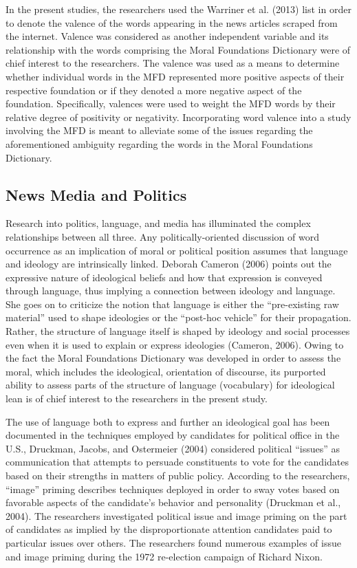 \documentclass[english,,man]{apa6}
\begin{document}
In the present studies, the researchers used the Warriner et al. (2013)
list in order to denote the valence of the words appearing in the news
articles scraped from the internet. Valence was considered as another
independent variable and its relationship with the words comprising the
Moral Foundations Dictionary were of chief interest to the researchers.
The valence was used as a means to determine whether individual words in
the MFD represented more positive aspects of their respective foundation
or if they denoted a more negative aspect of the foundation.
Specifically, valences were used to weight the MFD words by their
relative degree of positivity or negativity. Incorporating word valence
into a study involving the MFD is meant to alleviate some of the issues
regarding the aforementioned ambiguity regarding the words in the Moral
Foundations Dictionary.

\subsection{News Media and Politics}\label{news-media-and-politics}

Research into politics, language, and media has illuminated the complex
relationships between all three. Any politically-oriented discussion of
word occurrence as an implication of moral or political position assumes
that language and ideology are intrinsically linked. Deborah Cameron
(2006) points out the expressive nature of ideological beliefs and how
that expression is conveyed through language, thus implying a connection
between ideology and language. She goes on to criticize the notion that
language is either the \enquote{pre-existing raw material} used to shape
ideologies or the \enquote{post-hoc vehicle} for their propagation.
Rather, the structure of language itself is shaped by ideology and
social processes even when it is used to explain or express ideologies
(Cameron, 2006). Owing to the fact the Moral Foundations Dictionary was
developed in order to assess the moral, which includes the ideological,
orientation of discourse, its purported ability to assess parts of the
structure of language (vocabulary) for ideological lean is of chief
interest to the researchers in the present study.

The use of language both to express and further an ideological goal has
been documented in the techniques employed by candidates for political
office in the U.S., Druckman, Jacobs, and Ostermeier (2004) considered
political \enquote{issues} as communication that attempts to persuade
constituents to vote for the candidates based on their strengths in
matters of public policy. According to the researchers, \enquote{image}
priming describes techniques deployed in order to sway votes based on
favorable aspects of the candidate's behavior and personality (Druckman
et al., 2004). The researchers investigated political issue and image
priming on the part of candidates as implied by the disproportionate
attention candidates paid to particular issues over others. The
researchers found numerous examples of issue and image priming during
the 1972 re-election campaign of Richard Nixon.
\end{document}
